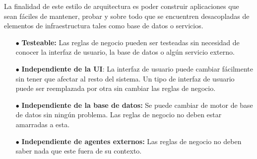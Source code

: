 La finalidad de este estilo de arquitectura es poder construir aplicaciones que sean fáciles de mantener, probar y sobre todo que se encuentren desacopladas de elementos de infraestructura tales como base de datos o servicios.

\begin{enumerate}
    \item[$\bullet$] \textbf{Testeable:} Las reglas de negocio pueden ser testeadas sin necesidad de conocer la interfaz de usuario, la base de datos o algún servicio externo.
    \item[$\bullet$] \textbf{Independiente de la UI}: La interfaz de usuario puede cambiar fácilmente sin tener que afectar al resto del sistema. Un tipo de interfaz de usuario puede ser reemplazada por otra sin cambiar las reglas de negocio.
    \item[$\bullet$] \textbf{Independiente de la base de datos:} Se puede cambiar de motor de base de datos sin ningún problema. Las reglas de negocio no deben estar amarradas a esta.
    \item[$\bullet$] \textbf{Independiente de agentes externos:} Las reglas de negocio no deben saber nada que este fuera de su contexto.
\end{enumerate}